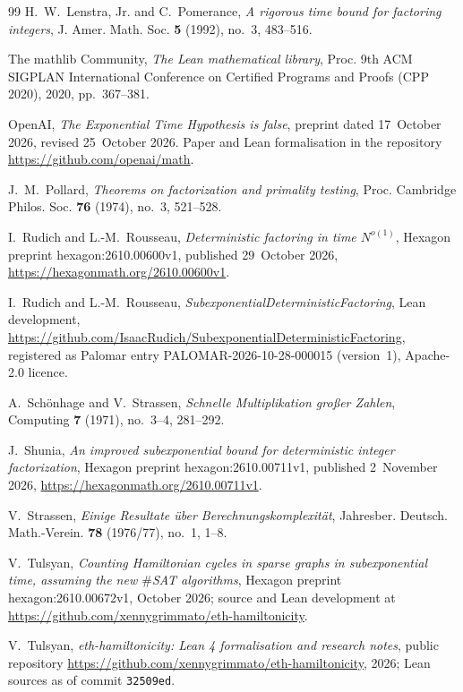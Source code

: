 \documentclass[10pt]{amsart}
\theoremstyle{plain}
\theoremstyle{definition}
\theoremstyle{remark}
\numberwithin{equation}{section}
\begin{document}
\begin{thebibliography}{99}
H.~W.~Lenstra, Jr. and C.~Pomerance, \emph{A rigorous time bound for factoring integers}, J. Amer. Math.
Soc. \textbf{5} (1992), no.~3, 483--516.

The mathlib Community, \emph{The {L}ean mathematical library}, Proc. 9th ACM SIGPLAN International
Conference on Certified Programs and Proofs (CPP 2020), 2020, pp.~367--381.

OpenAI, \emph{The {E}xponential {T}ime {H}ypothesis is false}, preprint dated 17~October 2026, revised
25~October 2026. Paper and Lean formalisation in the repository \url{https://github.com/openai/math}.

J.~M.~Pollard, \emph{Theorems on factorization and primality testing}, Proc. Cambridge Philos. Soc.
\textbf{76} (1974), no.~3, 521--528.

I.~Rudich and L.-M.~Rousseau, \emph{Deterministic factoring in time $N^{o(1)}$}, Hexagon preprint
hexagon:2610.00600v1, published 29~October 2026, \url{https://hexagonmath.org/2610.00600v1}.

I.~Rudich and L.-M.~Rousseau, \emph{SubexponentialDeterministicFactoring}, Lean development,
\url{https://github.com/IsaacRudich/SubexponentialDeterministicFactoring}, registered as Palomar entry
PALOMAR-2026-10-28-000015 (version~1), Apache-2.0 licence.

A.~Sch\"onhage and V.~Strassen, \emph{Schnelle {M}ultiplikation gro{\ss}er {Z}ahlen}, Computing
\textbf{7} (1971), no.~3--4, 281--292.

J.~Shunia, \emph{An improved subexponential bound for deterministic integer factorization}, Hexagon
preprint hexagon:2610.00711v1, published 2~November 2026, \url{https://hexagonmath.org/2610.00711v1}.

V.~Strassen, \emph{Einige {R}esultate {\"u}ber {B}erechnungskomplexit{\"a}t}, Jahresber. Deutsch.
Math.-Verein. \textbf{78} (1976/77), no.~1, 1--8.

V.~Tulsyan, \emph{Counting {H}amiltonian cycles in sparse graphs in subexponential time, assuming the
new $\#${SAT} algorithms}, Hexagon preprint hexagon:2610.00672v1, October 2026; source and Lean
development at \url{https://github.com/xennygrimmato/eth-hamiltonicity}.

V.~Tulsyan, \emph{eth-hamiltonicity: {L}ean 4 formalisation and research notes}, public repository
\url{https://github.com/xennygrimmato/eth-hamiltonicity}, 2026; Lean sources as of commit \texttt{32509ed}.

\end{thebibliography}
\end{document}
